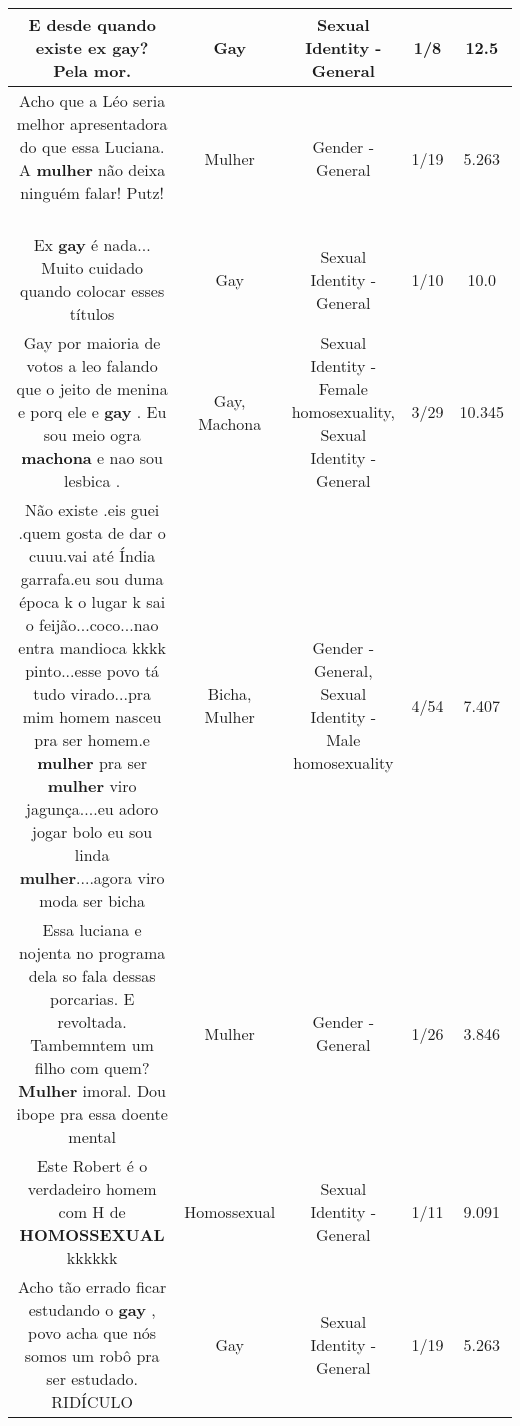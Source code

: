 \documentclass[11pt]{article}
\newlength\mylength
\begin{document}
\begin{center}
\begin{longtable}{|C{.65\mylength}|C{.30\mylength}|C{.12\mylength}|C{.12\mylength}|C{.12\mylength}|}
  \small E desde quando existe ex \textbf{gay}? Pela mor.\normalsize   & Gay & Sexual Identity - General & 1/8 & 12.5 \\  \hline
  \small Acho que a Léo seria melhor apresentadora do que essa Luciana. A \textbf{mulher} não deixa ninguém falar! Putz! 💩\normalsize   & Mulher & Gender - General & 1/19 & 5.263 \\  \hline
  \small Ex \textbf{gay} é nada... Muito cuidado quando colocar esses títulos\normalsize   & Gay & Sexual Identity - General & 1/10 & 10.0 \\  \hline
  \small Gay por maioria de votos a leo falando que o jeito de menina e porq ele e \textbf{gay} . Eu sou meio ogra \textbf{machona} e nao sou lesbica .\normalsize   & Gay, Machona & Sexual Identity - Female homosexuality, Sexual Identity - General & 3/29 & 10.345 \\  \hline
  \small Não existe .eis guei .quem gosta de dar o cuuu.vai até Índia garrafa.eu sou duma época k o lugar k sai o feijão...coco...nao entra mandioca kkkk pinto...esse povo tá tudo virado...pra mim homem nasceu pra ser homem.e \textbf{mulher} pra ser \textbf{mulher} viro jagunça....eu adoro jogar bolo eu sou linda \textbf{mulher}....agora viro moda ser bicha\normalsize   & Bicha, Mulher & Gender - General, Sexual Identity - Male homosexuality & 4/54 & 7.407 \\  \hline
  \small Essa luciana e nojenta no programa dela so fala dessas porcarias. E revoltada. Tambemntem um filho com quem? \textbf{Mulher} imoral. Dou ibope pra essa doente mental\normalsize   & Mulher & Gender - General & 1/26 & 3.846 \\  \hline
  \small Este Robert  é o  verdadeiro homem  com H  de  \textbf{HOMOSSEXUAL}  kkkkkk\normalsize   & Homossexual & Sexual Identity - General & 1/11 & 9.091 \\  \hline
  \small Acho tão errado ficar estudando o \textbf{gay} , povo acha que nós somos um robô pra ser estudado. RIDÍCULO\normalsize   & Gay & Sexual Identity - General & 1/19 & 5.263 \\  \hline

\end{longtable}
\end{center}
\end{document}
